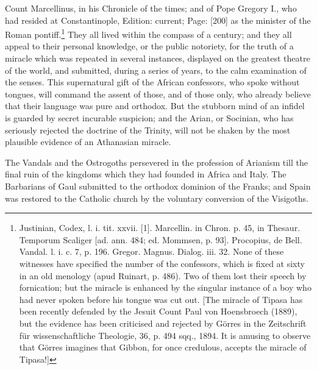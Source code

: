 Count Marcellinus, in his Chronicle of the times; and of Pope Gregory I., who had resided at Constantinople, Edition: current; Page: [200] as the minister of the Roman pontiff.\footnote{Justinian, Codex, l. i. tit. xxvii. [1]. Marcellin. in Chron. p. 45, in Thesaur. Temporum Scaliger [ad. ann. 484; ed. Mommsen, p. 93]. Procopius, de Bell. Vandal. l. i. c. 7, p. 196. Gregor. Magnus. Dialog. iii. 32. None of these witnesses have specified the number of the confessors, which is fixed at sixty in an old menology (apud Ruinart, p. 486). Two of them lost their speech by fornication; but the miracle is enhanced by the singular instance of a boy who had never spoken before his tongue was cut out. [The miracle of Tipasa has been recently defended by the Jesuit Count Paul von Hoensbroech (1889), but the evidence has been criticised and rejected by Görres in the Zeitschrift für wissenschaftliche Theologie, 36, p. 494 sqq., 1894. It is amusing to observe that Görres imagines that Gibbon, for once credulous, accepts the miracle of Tipasa!]} They all lived within the compass of a century; and they all appeal to their personal knowledge, or the public notoriety, for the truth of a miracle which was repeated in several instances, displayed on the greatest theatre of the world, and submitted, during a series of years, to the calm examination of the senses. This supernatural gift of the African confessors, who spoke without tongues, will command the assent of those, and of those only, who already believe that their language was pure and orthodox. But the stubborn mind of an infidel is guarded by secret incurable suspicion; and the Arian, or Socinian, who has seriously rejected the doctrine of the Trinity, will not be shaken by the most plausible evidence of an Athanasian miracle.

The Vandals and the Ostrogoths persevered in the profession of Arianism till the final ruin of the kingdoms which they had founded in Africa and Italy. The Barbarians of Gaul submitted to the orthodox dominion of the Franks; and Spain was restored to the Catholic church by the voluntary conversion of the Visigoths.

